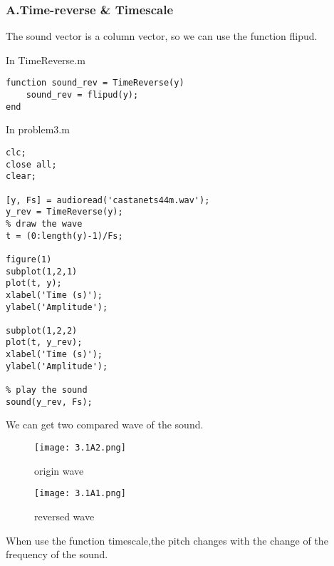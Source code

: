 \documentclass{article}
\begin{document}
\subsubsection*{A.Time-reverse \& Timescale}
The sound vector is a column vector, 
so we can use the function flipud.\par
In TimeReverse.m
\begin{lstlisting}
function sound_rev = TimeReverse(y)
    sound_rev = flipud(y);
end
\end{lstlisting}
In problem3.m
\begin{lstlisting}
clc;
close all;
clear;

[y, Fs] = audioread('castanets44m.wav');
y_rev = TimeReverse(y);
% draw the wave
t = (0:length(y)-1)/Fs;

figure(1)
subplot(1,2,1)
plot(t, y);
xlabel('Time (s)');
ylabel('Amplitude');

subplot(1,2,2)
plot(t, y_rev);
xlabel('Time (s)');
ylabel('Amplitude');

% play the sound
sound(y_rev, Fs);
\end{lstlisting} 

\newpage
We can get two compared wave of the sound.
\begin{figure}[h]
    \begin{minipage}{0.45\textwidth}
        \centering
        \texttt{[image: 3.1A2.png]}
        \caption{origin wave}
    \end{minipage}
    \begin{minipage}{0.45\textwidth}
        \centering
        \texttt{[image: 3.1A1.png]}
        \caption{reversed wave}
    \end{minipage}
\end{figure}

\par
When use the function timescale,the pitch changes with the change of the frequency of the sound.
\end{document}
